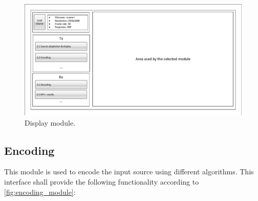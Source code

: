 \documentclass{article}
\begin{document}
\begin{figure}[htbp]
    \centering
    \includegraphics[page=2,width=1\textwidth]{Drawings.pdf}
    \caption{Display module.}
    \label{fig:display_module}
\end{figure}








\subsection{Encoding}

This module is used to encode the input source using different algorithms. This interface shall provide the following functionality according to \cref{fig:encoding_module}:
\end{document}

